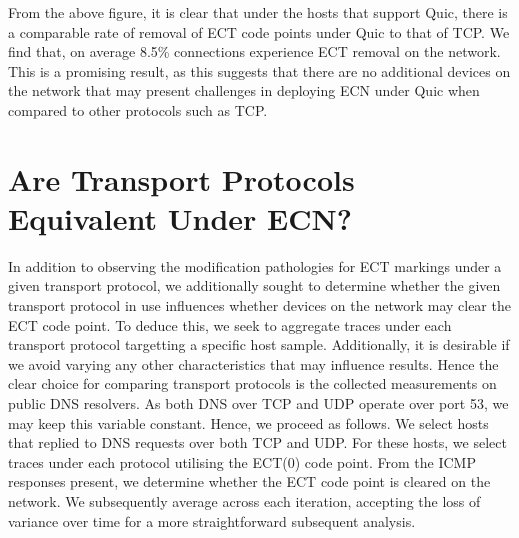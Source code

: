 \documentclass{l4proj}
\begin{document}
From the above figure, it is clear that under the hosts that support Quic, there is a comparable rate of removal of ECT code points under Quic to that of TCP. We find that, on average 8.5\% connections experience ECT removal on the network. This is a promising result, as this suggests that there are no additional devices on the network that may present challenges in deploying ECN under Quic when compared to other protocols such as TCP. 

\section{Are Transport Protocols Equivalent Under ECN?}

In addition to observing the modification pathologies for ECT markings under a given transport protocol, we additionally sought to determine whether the given transport protocol in use influences whether devices on the network may clear the ECT code point. To deduce this, we seek to aggregate traces under each transport protocol targetting a specific host sample. Additionally, it is desirable if we avoid varying any other characteristics that may influence results. Hence the clear choice for comparing transport protocols is the collected measurements on public DNS resolvers. As both DNS over TCP and UDP operate over port 53, we may keep this variable constant. Hence, we proceed as follows. We select hosts that replied to DNS requests over both TCP and UDP. For these hosts, we select traces under each protocol utilising the ECT(0) code point. From the ICMP responses present, we determine whether the ECT code point is cleared on the network. We subsequently average across each iteration, accepting the loss of variance over time for a more straightforward subsequent analysis.
\end{document}

